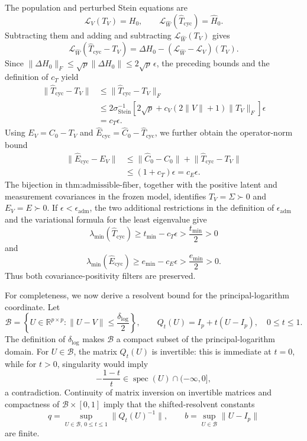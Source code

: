 The population and perturbed Stein equations are
\[
 \mathcal L_V(T_V)=H_0,
 \qquad
 \mathcal L_{\widehat W}(\widehat T_{\mathrm{cyc}})=\widehat H_0.
\]
Subtracting them and adding and subtracting \(\mathcal L_{\widehat W}(T_V)\) gives
\[
 \mathcal L_{\widehat W}(\widehat T_{\mathrm{cyc}}-T_V)
 =\Delta H_0-(\mathcal L_{\widehat W}-\mathcal L_V)(T_V).
\]
Since \(\lVert\Delta H_0\rVert_F\le\sqrt p\lVert\Delta H_0\rVert\le2\sqrt p\,\epsilon\), the preceding bounds and the definition of \(c_T\) yield
\[
 \begin{aligned}
 \lVert\widehat T_{\mathrm{cyc}}-T_V\rVert
 &\le\lVert\widehat T_{\mathrm{cyc}}-T_V\rVert_F\\
 &\le2\sigma_{\mathrm{Stein}}^{-1}
 \left[2\sqrt p+c_V(2\lVert V\rVert+1)\lVert T_V\rVert_F\right]\epsilon\\
 &=c_T\epsilon.
 \end{aligned}
\]
Using \(E_V=C_0-T_V\) and \(\widehat E_{\mathrm{cyc}}=\widehat C_0-\widehat T_{\mathrm{cyc}}\), we further obtain the operator-norm bound
\[
 \begin{aligned}
 \lVert\widehat E_{\mathrm{cyc}}-E_V\rVert
 &\le\lVert\widehat C_0-C_0\rVert
     +\lVert\widehat T_{\mathrm{cyc}}-T_V\rVert\\
 &\le(1+c_T)\epsilon
 =c_E\epsilon.
 \end{aligned}
\]
The bijection in \(\text{thm:admissible-fiber}\), together with the positive latent and measurement covariances in the frozen model, identifies \(T_V=\Sigma\succ0\) and \(E_V=E\succ0\).  If \(\epsilon<\epsilon_{\mathrm{adm}}\), the two additional restrictions in the definition of \(\epsilon_{\mathrm{adm}}\) and the variational formula for the least eigenvalue give
\[
 \lambda_{\min}(\widehat T_{\mathrm{cyc}})
 \ge t_{\min}-c_T\epsilon
 >\frac{t_{\min}}2>0
\]
and
\[
 \lambda_{\min}(\widehat E_{\mathrm{cyc}})
 \ge e_{\min}-c_E\epsilon
 >\frac{e_{\min}}2>0.
\]
Thus both covariance-positivity filters are preserved.

For completeness, we now derive a resolvent bound for the principal-logarithm coordinate.  Let
\[
 \mathcal B=\left\{U\in\mathbb R^{p\times p}:
 \lVert U-V\rVert\le\frac{\delta_{\log}}2\right\},
 \qquad
 Q_t(U)=I_p+t(U-I_p),\quad 0\le t\le1.
\]
The definition of \(\delta_{\log}\) makes \(\mathcal B\) a compact subset of the principal-logarithm domain.  For \(U\in\mathcal B\), the matrix \(Q_t(U)\) is invertible: this is immediate at \(t=0\), while for \(t>0\), singularity would imply
\[
 -\frac{1-t}{t}\in\operatorname{spec}(U)\cap(-\infty,0],
\]
a contradiction.  Continuity of matrix inversion on invertible matrices and compactness of \(\mathcal B\times[0,1]\) imply that the shifted-resolvent constants
\[
 q=\sup_{U\in\mathcal B,\,0\le t\le1}\lVert Q_t(U)^{-1}\rVert,
 \qquad
 b=\sup_{U\in\mathcal B}\lVert U-I_p\rVert
\]
are finite.

